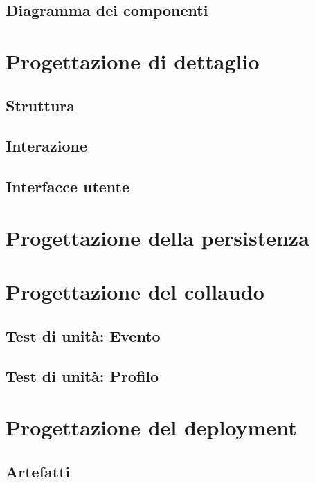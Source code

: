 \documentclass[12pt,a4paper]{report}
\begin{document}
\subsection{Diagramma dei componenti}

\newpage
\section{Progettazione di dettaglio}

\subsection{Struttura}

\subsection{Interazione}

\subsection{Interfacce utente}

\newpage
\section{Progettazione della persistenza}

\newpage
\section{Progettazione del collaudo}

\subsection{Test di unità: Evento}

\subsection{Test di unità: Profilo}

\newpage
\section{Progettazione del deployment}

\subsection{Artefatti}
\end{document}
